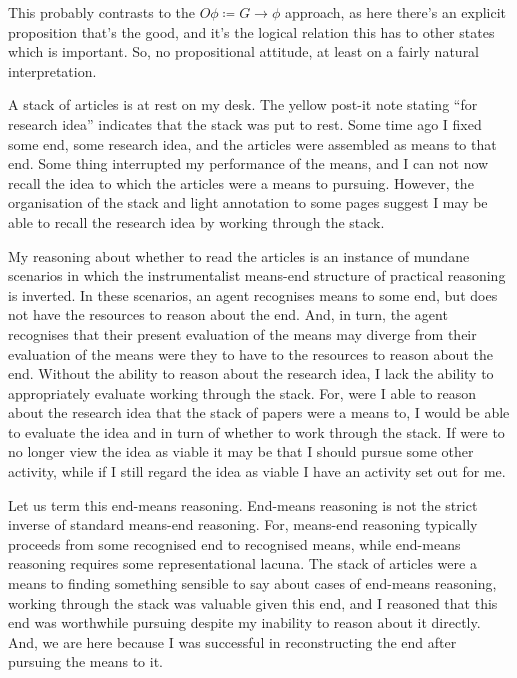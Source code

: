 \documentclass[10pt]{article}
\begin{document}
This probably contrasts to the \(O\phi \coloneq G \rightarrow \phi\) approach, as here there's an explicit proposition that's the good, and it's the logical relation this has to other states which is important.
So, no propositional attitude, at least on a fairly natural interpretation.



\newpage

A stack of articles is at rest on my desk.
The yellow post-it note stating ``for research idea'' indicates that the stack was put to rest.
Some time ago I fixed some end, some research idea, and the articles were assembled as means to that end.
Some thing interrupted my performance of the means, and I can not now recall the idea to which the articles were a means to pursuing.
However, the organisation of the stack and light annotation to some pages suggest I may be able to recall the research idea by working through the stack.

My reasoning about whether to read the articles is an instance of mundane scenarios in which the instrumentalist means-end structure of practical reasoning is inverted.
In these scenarios, an agent recognises means to some end, but does not have the resources to reason about the end.
And, in turn, the agent recognises that their present evaluation of the means may diverge from their evaluation of the means were they to have to the resources to reason about the end.
Without the ability to reason about the research idea, I lack the ability to appropriately evaluate working through the stack.
For, were I able to reason about the research idea that the stack of papers were a means to, I would be able to evaluate the idea and in turn of whether to work through the stack.
If were to no longer view the idea as viable it may be that I should pursue some other activity, while if I still regard the idea as viable I have an activity set out for me.

Let us term this end-means reasoning.
End-means reasoning is not the strict inverse of standard means-end reasoning.
For, means-end reasoning typically proceeds from some recognised end to recognised means, while end-means reasoning requires some representational lacuna.
The stack of articles were a means to finding something sensible to say about cases of end-means reasoning, working through the stack was valuable given this end, and I reasoned that this end was worthwhile pursuing despite my inability to reason about it directly.
And, we are here because I was successful in reconstructing the end after pursuing the means to it.
\end{document}
